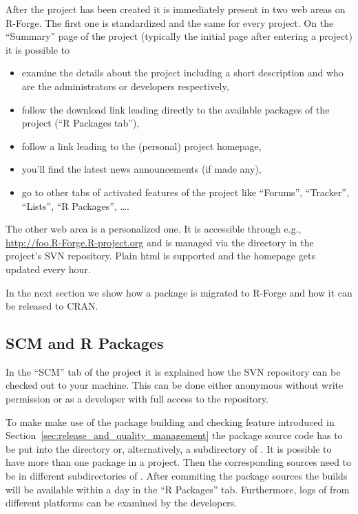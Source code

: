 
After the project has been created it is immediately present in
two web areas on R-Forge. The first one is standardized and the same for every
project. On the ``Summary'' page of the project (typically the initial page after entering a
project) it is possible to

\begin{itemize}
\item examine the details about the project including a short
  description and who are the administrators or developers respectively,
\item follow the download link leading directly to the available packages
  of the project (``R Packages tab''),
\item follow a link leading to the (personal) project homepage,

\item you'll find the latest news announcements (if made any),
\item go to other tabs of activated features of the project like
  ``Forums'', ``Tracker'',
   ``Lists'', ``R Packages'', \ldots{}.
\end{itemize}

The other web area is a personalized one. It is accessible
through e.g., \url{http://foo.R-Forge.R-project.org} and is managed via
the  directory in the project's SVN repository. Plain html
is supported and the homepage gets updated every hour.

In the next section we show how a package is migrated to R-Forge and
how it can be released to CRAN.

\subsection{SCM and R Packages}

In the ``SCM'' tab of the project it is explained how the SVN
repository can be checked out to your machine. This can be done either
anonymous without write permission or as a developer with full access
to the repository. 

To make make use of the package building and
checking feature introduced in
Section~\ref{sec:release_and_quality_management} the package source
code has to be put into the  directory or, alternatively, a
subdirectory of . It is possible to have more than one package
in a project. Then the corresponding sources need to be in different
subdirectories of . After commiting the package sources the
builds will be available within a day in the ``R Packages''
tab. Furthermore, logs of  from different platforms
can be examined by the developers.

